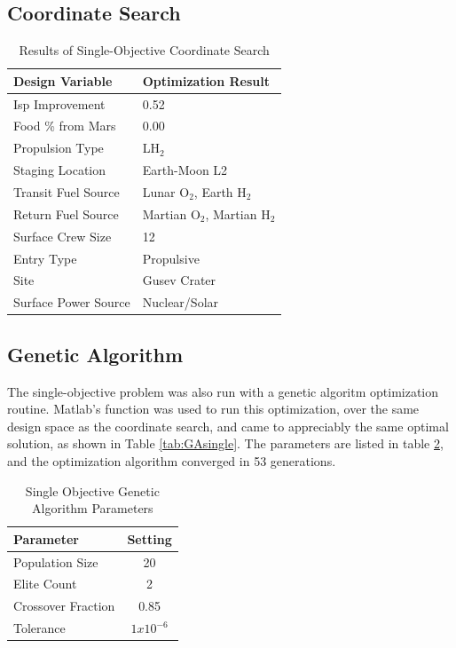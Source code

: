 \documentclass[]{aiaa-pretty}
\begin{document}
\subsection{Coordinate Search}
\begin{table}[h!]
	\centering
	\caption{Results of Single-Objective Coordinate Search}
	\label{tab:CoordResults}
	\begin{tabular}{ll}
		\textbf{Design Variable} & \textbf{Optimization Result}\\ \hline
		Isp Improvement & 0.52 \\
		Food \% from Mars & 0.00 \\
		Propulsion Type & LH$_2$ \\
		Staging Location & Earth-Moon L2 \\
		Transit Fuel Source & Lunar O$_2$, Earth H$_2$ \\
		Return Fuel Source & Martian O$_2$, Martian H$_2$ \\
		Surface Crew Size & 12\\
		Entry Type & Propulsive \\
		Site & Gusev Crater \\
		Surface Power Source & Nuclear/Solar\\
	\end{tabular}
\end{table}
\subsection{Genetic Algorithm}

The single-objective problem was also run with a genetic algoritm optimization routine. Matlab's  function was used to run this optimization, over the same design space as the coordinate search, and came to appreciably the same optimal solution, as shown in Table \ref{tab:GAsingle}. The  parameters are listed in table \ref{tab:gasingleparams}, and the optimization algorithm converged in 53 generations.

\begin{table}[h]
	\centering
	\caption{Single Objective Genetic Algorithm Parameters}
	\label{tab:gasingleparams}
	\begin{tabular}{lc}
		\textbf{Parameter} & \textbf{Setting} \\ \hline
		Population Size & 20\\
		Elite Count & 2\\
		Crossover Fraction & 0.85\\
		Tolerance & $1x10^{-6}$\\
	\end{tabular}
	\end{table}
\end{document}
